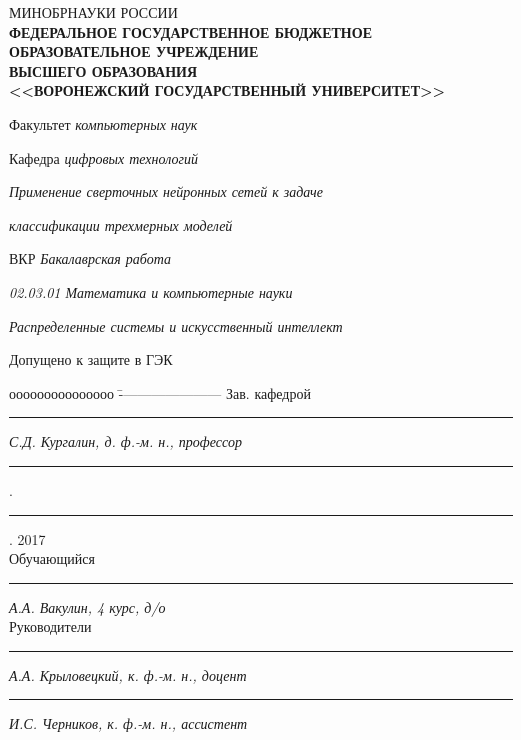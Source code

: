 \documentclass[14pt]{article}
\numberwithin{figure}{section}
\numberwithin{equation}{section}
\begin{document}
{\sffamily

\begin{titlepage}

\thispagestyle{empty}

\center

{\small МИНОБРНАУКИ РОССИИ}\\  \!  \!  \!
{\footnotesize \textbf{ФЕДЕРАЛЬНОЕ ГОСУДАРСТВЕННОЕ БЮДЖЕТНОЕ ОБРАЗОВАТЕЛЬНОЕ УЧРЕЖДЕНИЕ}}\\ \!  \!  \!
{\footnotesize  \textbf{ВЫСШЕГО ОБРАЗОВАНИЯ}}\\ \!  \!
{\small \textbf{<<ВОРОНЕЖСКИЙ ГОСУДАРСТВЕННЫЙ УНИВЕРСИТЕТ>>}}\\ \!  \!

\vspace{0.3cm}

{\small

    \centerline{Факультет \emph{компьютерных наук}}
    \vspace{0.3cm}
    \centerline{Кафедра \emph{цифровых технологий}}

    \vspace{1cm}

    \centerline{\emph{Применение сверточных нейронных сетей к задаче }}
    \centerline{\emph{классификации трехмерных моделей}}

    \vspace{1cm}

    \centerline{ВКР \emph{Бакалаврская работа}}
    \centerline{\emph{02.03.01 Математика и компьютерные науки}}
    \centerline{\emph{Распределенные системы и искусственный интеллект}}

    \vfill
    \begin{flushleft}
    \raggedright{Допущено к защите в ГЭК}
    \end{flushleft}
    \begin{tabbing}
    ооооооооооооооо	\=	----------------------	\kill
    Зав. кафедрой	\> 	\rule[0mm]{4cm}{0,3mm}	\emph{С.Д. Кургалин, д. ф.-м. н., профессор } \rule[0mm]{5mm}{0,3mm} . \rule[0mm]{5mm}{0,3mm} . 2017\\
    Обучающийся 	\> 	\rule[0mm]{4cm}{0,3mm}	\emph{А.А. Вакулин, 4 курс, д/о}             \\
    Руководители	\> 	\rule[0mm]{4cm}{0,3mm}  \emph{А.А. Крыловецкий, к. ф.-м. н., доцент} \\
    				\> 	\rule[0mm]{4cm}{0,3mm}  \emph{И.С. Черников, к. ф.-м. н., ассистент}
    \end{tabbing}

}
\end{titlepage}}
\end{document}
